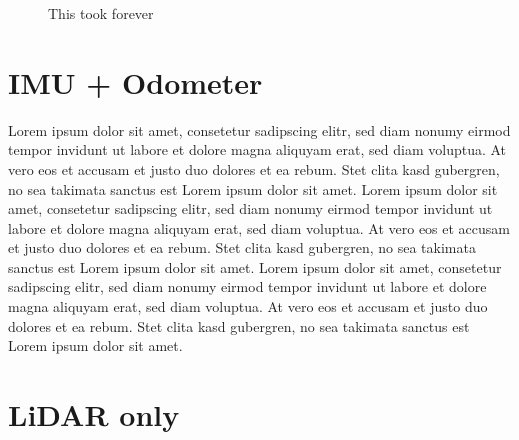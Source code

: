 \begin{figure}[htpb]
	\caption{This took forever}
\end{figure}

\section{IMU + Odometer}
Lorem ipsum dolor sit amet, consetetur sadipscing elitr, sed diam nonumy eirmod tempor invidunt ut labore et dolore magna aliquyam erat, sed diam voluptua. At vero eos et accusam et justo duo dolores et ea rebum. Stet clita kasd gubergren, no sea takimata sanctus est Lorem ipsum dolor sit amet. Lorem ipsum dolor sit amet, consetetur sadipscing elitr, sed diam nonumy eirmod tempor invidunt ut labore et dolore magna aliquyam erat, sed diam voluptua. At vero eos et accusam et justo duo dolores et ea rebum. Stet clita kasd gubergren, no sea takimata sanctus est Lorem ipsum dolor sit amet. Lorem ipsum dolor sit amet, consetetur sadipscing elitr, sed diam nonumy eirmod tempor invidunt ut labore et dolore magna aliquyam erat, sed diam voluptua. At vero eos et accusam et justo duo dolores et ea rebum. Stet clita kasd gubergren, no sea takimata sanctus est Lorem ipsum dolor sit amet.

\section{LiDAR only}

